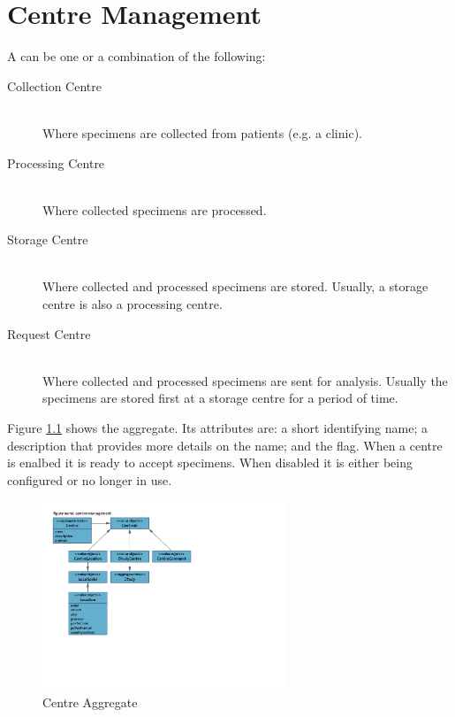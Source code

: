 \chapter{Centre Management}
\label{chap:centre-management}

A  can be one or a combination of the following:
\begin{description}

\item[Collection Centre] \hfill \\ Where specimens are collected from patients
  (e.g. a clinic).

\item[Processing Centre] \hfill \\ Where collected specimens are processed.

\item[Storage Centre] \hfill \\ Where collected and processed specimens are
  stored. Usually, a storage centre is also a processing centre.

\item[Request Centre] \hfill \\ Where collected and processed specimens are
  sent for analysis. Usually the specimens are stored first at a storage
  centre for a period of time.
\end{description}

Figure \ref{fig:centre-aggregate} shows the  aggregate. Its
attributes are: a short identifying name; a description that provides more
details on the name; and the  flag. When a centre is enalbed
it is ready to accept specimens. When disabled it is either being configured or
no longer in use.

\begin{figure}[H]
  \centering
  \includegraphics[trim={10mm 62mm 108mm 18mm}, clip,
    width=0.65\textwidth]{images/centre-management}
  \caption{Centre Aggregate}
  \label{fig:centre-aggregate}
\end{figure}

